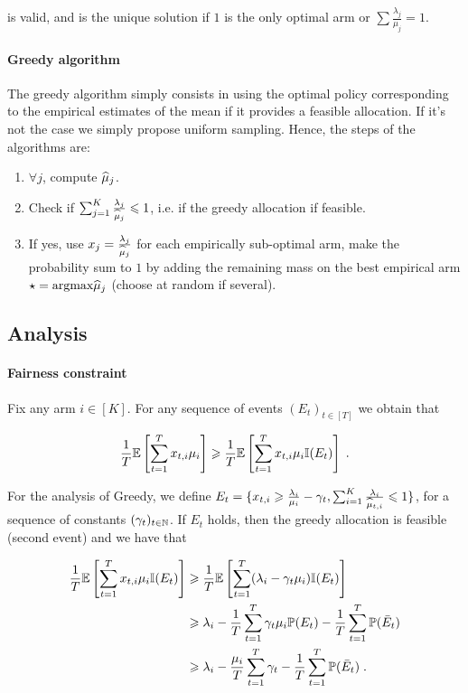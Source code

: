 is valid, and is the unique solution if $1$ is the only optimal arm or $\sum \frac{\lambda_j}{\mu_j}=1$.

\paragraph{Greedy algorithm} The greedy algorithm simply consists in using the optimal policy corresponding to the empirical estimates of the mean if it provides a feasible allocation. If it's not the case we simply propose uniform sampling. Hence, the steps of the algorithms are: 
\begin{enumerate}
	\item $\forall j$, compute $\widehat{\mu}_j$.
	\item Check if $\sum_{j=1}^K \frac{\lambda_j}{\widehat{\mu}_j} \leqslant  1$, i.e. if the greedy allocation if feasible.
	\item If yes, use $x_j=\frac{\lambda_j}{\widehat{\mu}_j}$ for each empirically sub-optimal arm, make the probability sum to $1$ by adding the remaining mass on the best empirical arm $\star = \text{argmax} \widehat{\mu}_j$ (choose at random if several).
\end{enumerate}


\subsection{Analysis}

\paragraph{Fairness constraint} Fix any arm $i \in [K]$. For any sequence of events $(E_t)_{t\in[T]}$ we obtain that 

\begin{align*} 
\frac{1}{T} \mathbb{E}\left[\sum_{t=1}^T x_{t,i} \mu_i \right] \geqslant 
\frac{1}{T} \mathbb{E}\left[\sum_{t=1}^T x_{t,i} \mu_i \mathbb{I}(E_t) \right]\;.
\end{align*}

For the analysis of Greedy, we define $E_t = \{x_{t,i} \geqslant \frac{\lambda_i}{\mu_i}-\gamma_t, \sum_{i=1}^K \frac{\lambda_i}{\widehat{\mu}_{t, i}}\leqslant 1 \}$, for a sequence of constants $(\gamma_t)_{t \in \mathbb{N}}$. If $E_t$ holds, then the greedy allocation is feasible (second event) and we have that 

\begin{align*}  
\frac{1}{T} \mathbb{E}\left[\sum_{t=1}^T x_{t,i} \mu_i \mathbb{I}(E_t) \right] &\geqslant \frac{1}{T} \mathbb{E}\left[\sum_{t=1}^T (\lambda_i - \gamma_t \mu_i) \mathbb{I}(E_t) \right] \\
& \geqslant  \lambda_i - \frac{1}{T} \sum_{t=1}^T \gamma_t \mu_i \mathbb{P}(E_t) - \frac{1}{T} \sum_{t=1}^T \mathbb{P}(\bar E_t) \\
& \geqslant  \lambda_i - \frac{\mu_i}{T} \sum_{t=1}^T \gamma_t - \frac{1}{T} \sum_{t=1}^T  \mathbb{P}(\bar E_t)\;.
\end{align*}

